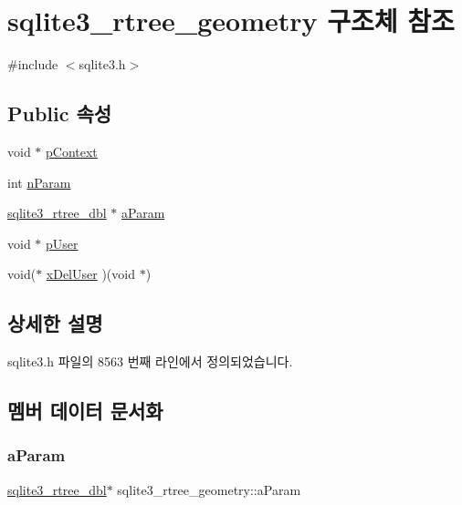 \hypertarget{structsqlite3__rtree__geometry}{}\section{sqlite3\+\_\+rtree\+\_\+geometry 구조체 참조}
\label{structsqlite3__rtree__geometry}


{\ttfamily \#include $<$sqlite3.\+h$>$}

\subsection*{Public 속성}
\begin{DoxyCompactItemize}
\item 
void $\ast$ \hyperlink{structsqlite3__rtree__geometry_a62fe439a49ed5b8628464c418f35f572}{p\+Context}
\item 
int \hyperlink{structsqlite3__rtree__geometry_ada7b9eba82660e3321dd4c93526697c9}{n\+Param}
\item 
\hyperlink{sqlite3_8h_ae9156ff58620c1ceae9391f1afabae1b}{sqlite3\+\_\+rtree\+\_\+dbl} $\ast$ \hyperlink{structsqlite3__rtree__geometry_a0a22e4b810cb1b8f1af792fd50493002}{a\+Param}
\item 
void $\ast$ \hyperlink{structsqlite3__rtree__geometry_add62e1cd5faa6000c815104af3c540d0}{p\+User}
\item 
void($\ast$ \hyperlink{structsqlite3__rtree__geometry_ae9835a39924a75b33cce9f6b10e1813f}{x\+Del\+User} )(void $\ast$)
\end{DoxyCompactItemize}


\subsection{상세한 설명}


sqlite3.\+h 파일의 8563 번째 라인에서 정의되었습니다.



\subsection{멤버 데이터 문서화}
\mbox{\label{structsqlite3__rtree__geometry_a0a22e4b810cb1b8f1af792fd50493002}} 
\subsubsection{\texorpdfstring{a\+Param}{aParam}}
{\footnotesize\ttfamily \hyperlink{sqlite3_8h_ae9156ff58620c1ceae9391f1afabae1b}{sqlite3\+\_\+rtree\+\_\+dbl}$\ast$ sqlite3\+\_\+rtree\+\_\+geometry\+::a\+Param}



